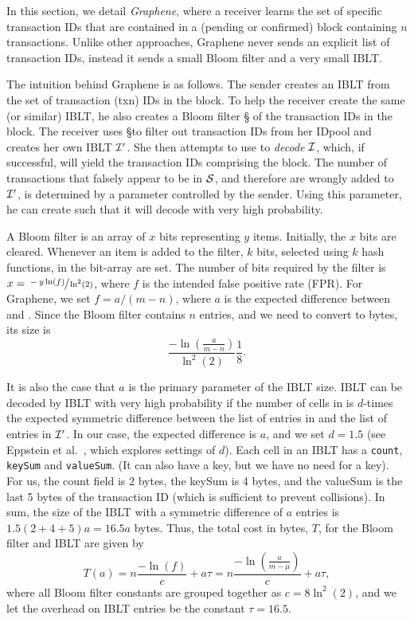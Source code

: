 In this section, we detail \emph{Graphene},
where a receiver 
learns the set of specific transaction IDs that are contained in a
(pending or confirmed) block containing $n$ transactions. Unlike other approaches, Graphene never  sends an explicit list of transaction IDs, instead it sends  a small Bloom filter and a very small IBLT.  



The intuition behind Graphene is as follows. The sender creates an IBLT \I
from the set of transaction (txn) IDs in the block. To help the receiver
create the same (or similar) IBLT, he also creates a Bloom filter \S
 of the transaction IDs in the block. The receiver uses \S to filter out
transaction IDs from her IDpool %
and creates her own IBLT $\cal{I}'$. She then attempts to use \Ip to \emph{decode} $\cal{I}$, which, if successful, will yield
the transaction IDs comprising the block. The number of transactions
that falsely appear to be in $\cal{S}$, and therefore are wrongly added to
$\cal{I}'$, is determined by a parameter controlled by the sender. Using
this parameter, he can
create \I such that it will decode with very high probability.  

A Bloom filter is an array of $x$ bits
representing $y$ items.  Initially, the $x$ bits are cleared. Whenever
an item is added to the filter, $k$ bits, selected using $k$ hash functions, in the bit-array are set. The number of bits
required by the filter is $x =\sfrac{-y\ln(f)}{\ln^2(2)}$, where $f$ is
the intended false positive rate (FPR).  For Graphene, we set $f=a/(m-n)$,
where $a$ is the expected difference between \I and \Ip .
Since the Bloom filter contains $n$ entries, and we need to convert to
bytes, its size is 
$$\frac{-\ln(\frac{a}{m-n})}{\ln^2(2)}\frac18. $$

It is also the case that $a$ is the primary parameter of the IBLT
size.  IBLT \I can be decoded by IBLT \Ip with very high probability
if the number of cells in \I is $d$-times the expected symmetric
difference between the list of entries in \I and the list of entries
in $\cal{I}'$. In our case, the expected difference is $a$, and we set
$d=1.5$ (see Eppstein et al.~\cite{eppstein:2011}, which explores
settings of $d$). Each cell in an IBLT has a {\tt count}, {\tt keySum} and
{\tt valueSum}.
(It can also have a key, but we have
no need for a key). For us, the count field is 2 bytes, the
keySum is 4 bytes, and the valueSum is the last 5 bytes of the
transaction ID (which is sufficient to prevent collisions). In sum,
the size of the IBLT with a symmetric difference of $a$ entries is
$1.5(2+4+5)a=16.5a$ bytes.
Thus, the total cost in bytes, $T$, for the Bloom filter and IBLT are
given by 
$$T(a)= n\frac{-\ln(f)}{c}+ a\tau = n\frac{-\ln(\frac{a}{m-\mu})}{c}+ a\tau,$$ 
where all Bloom filter constants are grouped together as
$c=8\ln^2(2)$, and we let the overhead on IBLT entries be the constant
$\tau=16.5$.

